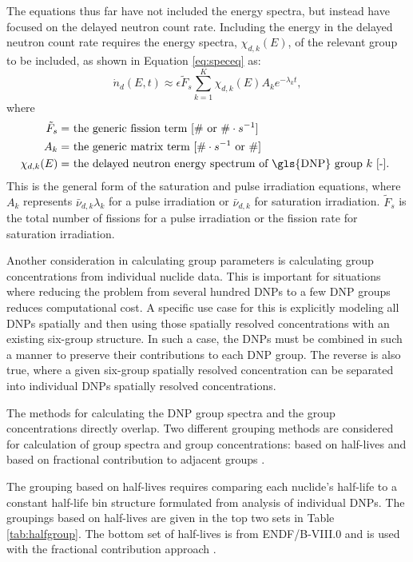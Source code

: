 The equations thus far have not included the energy spectra, but instead have focused on the delayed neutron count rate. 
Including the energy in the delayed neutron count rate requires the energy spectra, $\chi_{d, k}(E)$, of the relevant group to be included, as shown in Equation \eqref{eq:speceq} as:
\begin{equation}
\dot{n}_d(E, t) \approx \epsilon \tilde{F}_s \sum_{k=1}^{K} \chi_{d, k} (E) A_k e^{-\lambda_k t},
\label{eq:speceq}
\end{equation}
where
\begin{align}
    \tilde{F}_s =& \text{ the generic fission term [$\#$ or $\# \cdot s^{-1}$] } \nonumber \\
    A_k =& \text{ the generic matrix term [$\# \cdot s^{-1}$ or $\#$]  } \nonumber \\
    \chi_{d, k}(E) =& \text{ the delayed neutron energy spectrum of \gls{DNP} group $k$ [-]. } \nonumber
\end{align}
This is the general form of the saturation and pulse irradiation equations, where $A_k$ represents $\bar{\nu}_{d, k} \lambda_k$ for a pulse irradiation or $\bar{\nu}_{d, k}$ for saturation irradiation.
$\tilde{F}_s$ is the total number of fissions for a pulse irradiation or the fission rate for saturation irradiation.

Another consideration in calculating group parameters is calculating group concentrations from individual nuclide data.
This is important for situations where reducing the problem from several hundred \glspl{DNP} to a few \gls{DNP} groups reduces computational cost.
A specific use case for this is explicitly modeling all \glspl{DNP} spatially and then using those spatially resolved concentrations with an existing six-group structure.
In such a case, the \glspl{DNP} must be combined in such a manner to preserve their contributions to each \gls{DNP} group.
The reverse is also true, where a given six-group spatially resolved concentration can be separated into individual \glspl{DNP} spatially resolved concentrations.

The methods for calculating the \gls{DNP} group spectra and the group concentrations directly overlap.
Two different grouping methods are considered for calculation of group spectra and group concentrations: based on half-lives \cite{england1983aggregate, rudstam1982six} and based on fractional contribution to adjacent groups \cite{brady1988evaluation}.

The grouping based on half-lives requires comparing each nuclide's half-life to a constant half-life bin structure formulated from analysis of individual \glspl{DNP}.
The groupings based on half-lives are given in the top two sets in Table \ref{tab:halfgroup}.
The bottom set of half-lives is from ENDF/B-VIII.0 and is used with the fractional contribution approach \cite{Brown20181}.

